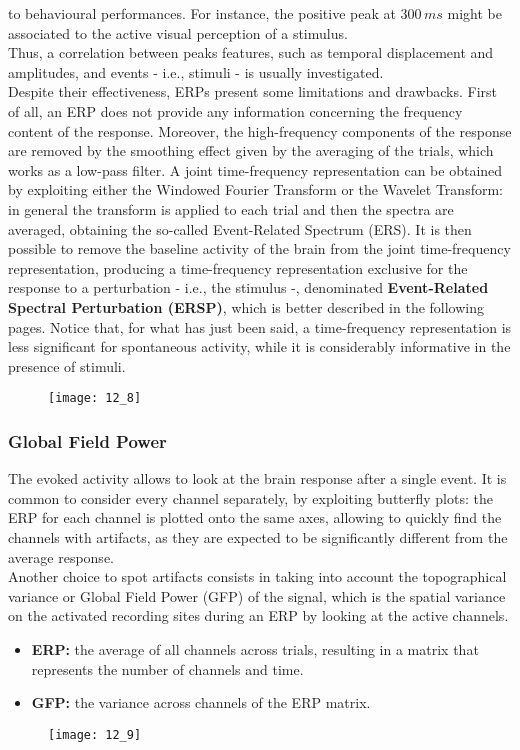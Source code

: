 to behavioural performances. For instance, the positive peak at \(300\,ms\) might be associated
to the active visual perception of a stimulus.\\
Thus, a correlation between peaks features, such as temporal displacement and amplitudes,
and events - i.e., stimuli - is usually investigated.\\
Despite their effectiveness, ERPs present some limitations and drawbacks. First of all, an
ERP does not provide any information concerning the frequency content of the response.
Moreover, the high-frequency components of the response are removed by the smoothing effect
given by the averaging of the trials, which works as a low-pass filter. A joint time-frequency
representation can be obtained by exploiting either the Windowed Fourier Transform or the
Wavelet Transform: in general the transform is applied to each trial and then the spectra
are averaged, obtaining the so-called Event-Related Spectrum (ERS). It is then possible
to remove the baseline activity of the brain from the joint time-frequency representation,
producing a time-frequency representation exclusive for the response to a perturbation
- i.e., the stimulus -, denominated \textbf{Event-Related Spectral Perturbation (ERSP)}, which is
better described in the following pages.
Notice that, for what has just been said, a time-frequency representation is less significant
for spontaneous activity, while it is considerably informative in the presence of stimuli.
\begin{figure}[H]
    \centering
    \texttt{[image: 12\_8]}
\end{figure}
\subsubsection{Global Field Power}
The evoked activity allows to look at the brain response after a single event. It is
common to consider every channel separately, by exploiting butterfly plots: the ERP for
each channel is plotted onto the same axes, allowing to quickly find the channels with
artifacts, as they are expected to be significantly different from the average response.\\
Another choice to spot artifacts consists in taking into account the topographical variance
or Global Field Power (GFP) of the signal, which is the spatial variance on the activated
recording sites during an ERP by looking at the active channels.
\begin{itemize}
    \item \textbf{ERP:} the average of all channels across trials, resulting in a matrix that
          represents the number of channels and time.
    \item \textbf{GFP:} the variance across channels of the ERP matrix.
\end{itemize}
\begin{figure}[H]
    \centering
    \texttt{[image: 12\_9]}
\end{figure}
